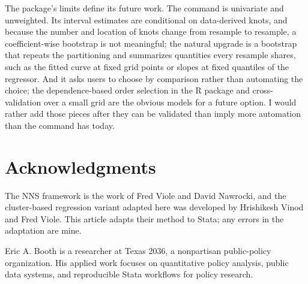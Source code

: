 The package's limits define its future work.  The command is univariate and
unweighted.  Its interval estimates are conditional on data-derived knots,
and because the number and location of knots change from resample to
resample, a coefficient-wise bootstrap is not meaningful; the natural upgrade
is a bootstrap that repeats the partitioning and summarizes quantities every
resample shares, such as the fitted curve at fixed grid points or slopes at
fixed quantiles of the regressor.  And it asks users to choose
 by comparison rather than automating the choice; the
dependence-based order selection in the R package \citep{viole_2026_nns} and
cross-validation over a small  grid are the obvious models for
a future  option.  I would rather add those pieces after
they can be validated than imply more automation than the command has today.

\section{Acknowledgments}

The NNS framework is the work of Fred Viole and David Nawrocki, and the
cluster-based regression variant adapted here was developed by Hrishikesh
Vinod and Fred Viole.  This article adapts their method to Stata; any errors
in the adaptation are mine.




\begin{aboutauthor}
Eric A. Booth is a researcher at Texas 2036, a nonpartisan public-policy
organization.  His applied work focuses on quantitative policy analysis,
public data systems, and reproducible Stata workflows for policy research.
\end{aboutauthor}

\endinput
